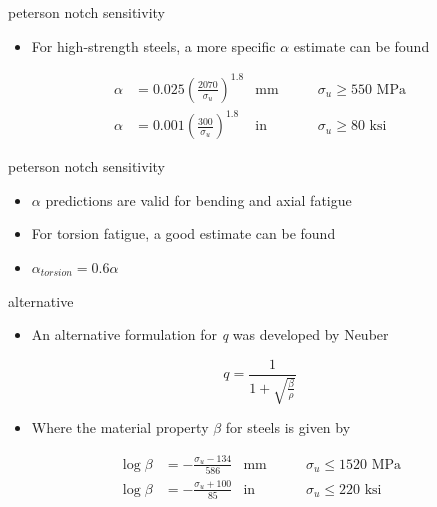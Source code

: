 \documentclass[
  letterpaper,
  ignorenonframetext,
  aspectratio=43,
  handout,
  12pt]{beamer}
\providecommand{\tightlist}{%
  \setlength{\itemsep}{0pt}\setlength{\parskip}{0pt}}
\providecommand{\tightlist}{%
\setlength{\itemsep}{0pt}\setlength{\parskip}{0pt}}
\begin{document}
\begin{frame}{peterson notch sensitivity}
\protect\hypertarget{peterson-notch-sensitivity-2}{}
\begin{itemize}
\tightlist
\item
  For high-strength steels, a more specific \(\alpha\) estimate can be
  found
\end{itemize}

\[\begin{aligned}
  \alpha &= 0.025 \left(\frac{2070 }{\sigma_u}\right)^{1.8} & \text{mm} & \qquad \sigma_u \ge 550 \text{ MPa}\\
  \alpha &= 0.001 \left(\frac{300 }{\sigma_u}\right)^{1.8} & \text{in} & \qquad \sigma_u \ge 80 \text{ ksi}
\end{aligned}\]
\end{frame}

\begin{frame}{peterson notch sensitivity}
\protect\hypertarget{peterson-notch-sensitivity-3}{}
\begin{itemize}
\tightlist
\item
  \(\alpha\) predictions are valid for bending and axial fatigue
\item
  For torsion fatigue, a good estimate can be found
\item
  \(\alpha_{torsion} = 0.6\alpha\)
\end{itemize}
\end{frame}

\begin{frame}{alternative}
\protect\hypertarget{alternative}{}
\begin{itemize}
\tightlist
\item
  An alternative formulation for \emph{q} was developed by Neuber
\end{itemize}

\[q = \frac{1}{1+\sqrt{\frac{\beta}{\rho}}}\]

\begin{itemize}
\tightlist
\item
  Where the material property \(\beta\) for steels is given by
\end{itemize}

\[\begin{aligned}
  \log \beta &= -\frac{\sigma_u - 134}{586} & \text{mm} & \qquad \sigma_u \le 1520 \text{ MPa}\\
  \log \beta &= -\frac{\sigma_u + 100}{85}& \text{in} & \qquad \sigma_u \le 220 \text{ ksi}
\end{aligned}\]
\end{frame}
\end{document}

